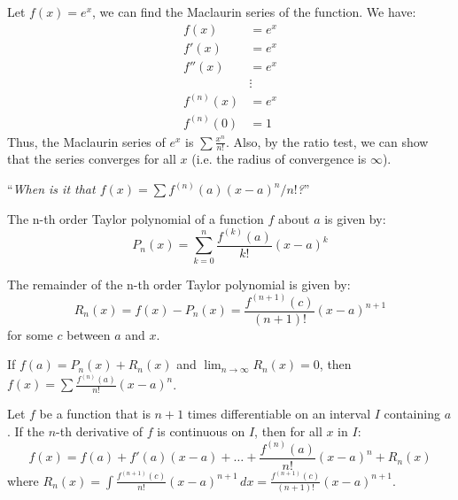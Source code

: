 \documentclass[11pt]{article}
\begin{document}
\begin{example}
    Let $f(x) = e^x$, we can find the Maclaurin series of the function. We have:
    \begin{align*}
        f(x) &= e^x \\
        f'(x) &= e^x \\
        f''(x) &= e^x \\
        &\vdots \\
        f^{(n)}(x) &= e^x \\
        f^{(n)}(0) &= 1
    \end{align*}
    Thus, the Maclaurin series of $e^x$ is $\sum \frac{x^n}{n!}$. Also, by the ratio test, we can show that the series converges for all $x$ (i.e. the radius of convergence is $\infty$).
\end{example}
\begin{center}
    ``\textit{When is it that $f(x) = \sum f^{(n)}(a) (x-a)^n/n!$?}''
\end{center}
\begin{definition}
    The n-th order Taylor polynomial of a function $f$ about $a$ is given by:
    \begin{equation}
        P_n(x) = \sum_{k=0}^{n} \frac{f^{(k)}(a)}{k!} (x-a)^k
    \end{equation}
\end{definition}
\begin{definition}[Remainder]
    The remainder of the n-th order Taylor polynomial is given by:
    \begin{equation}
        R_n(x) = f(x) - P_n(x) = \frac{f^{(n+1)}(c)}{(n+1)!} (x-a)^{n+1}
    \end{equation}
    for some $c$ between $a$ and $x$.
\end{definition}
\begin{theorem}
    If $f(a) = P_n(x) + R_n(x)$ and $\lim_{n \to \infty} R_n(x) = 0$, then $f(x) = \sum \frac{f^{(n)}(a)}{n!} (x-a)^n$.
\end{theorem}
\begin{theorem}
    Let $f$ be a function that is $n+1$ times differentiable on an interval $I$ containing $a$. If the $n$-th derivative of $f$ is continuous on $I$, then for all $x$ in $I$:
    \begin{equation}
        f(x) = f(a) + f'(a)(x-a) + \ldots + \frac{f^{(n)}(a)}{n!} (x-a)^n + R_n(x)
    \end{equation}
    where $R_n(x) = \int \frac{f^{(n+1)}(c)}{n!} (x-a)^{n+1} \, dx = \frac{f^{(n+1)}(c)}{(n+1)!} (x-a)^{n+1}$.
\end{theorem}
\end{document}
